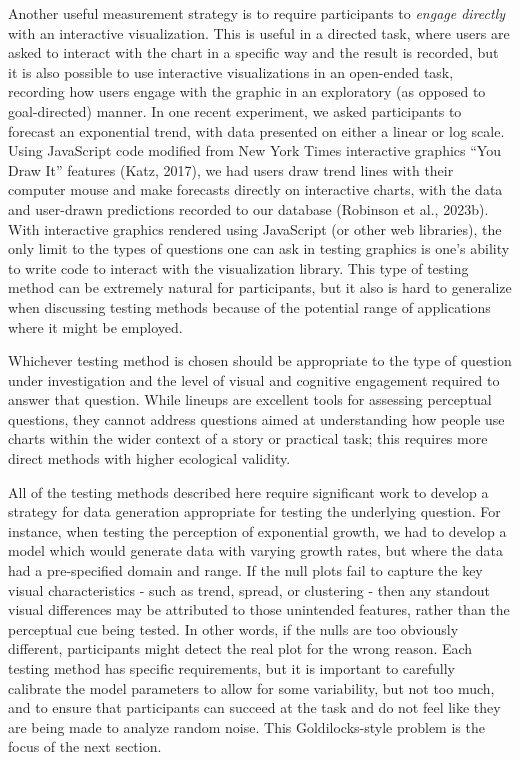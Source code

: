 \documentclass[
  10pt,
]{article}
\begin{document}
Another useful measurement strategy is to require participants to
\emph{engage directly} with an interactive visualization. This is useful
in a directed task, where users are asked to interact with the chart in
a specific way and the result is recorded, but it is also possible to
use interactive visualizations in an open-ended task, recording how
users engage with the graphic in an exploratory (as opposed to
goal-directed) manner. In one recent experiment, we asked participants
to forecast an exponential trend, with data presented on either a linear
or log scale. Using JavaScript code modified from New York Times
interactive graphics ``You Draw It'' features (Katz, 2017), we had users
draw trend lines with their computer mouse and make forecasts directly
on interactive charts, with the data and user-drawn predictions recorded
to our database (Robinson et al., 2023b). With interactive graphics
rendered using JavaScript (or other web libraries), the only limit to
the types of questions one can ask in testing graphics is one's ability
to write code to interact with the visualization library. This type of
testing method can be extremely natural for participants, but it also is
hard to generalize when discussing testing methods because of the
potential range of applications where it might be employed.

Whichever testing method is chosen should be appropriate to the type of
question under investigation and the level of visual and cognitive
engagement required to answer that question. While lineups are excellent
tools for assessing perceptual questions, they cannot address questions
aimed at understanding how people use charts within the wider context of
a story or practical task; this requires more direct methods with higher
ecological validity.

All of the testing methods described here require significant work to
develop a strategy for data generation appropriate for testing the
underlying question. For instance, when testing the perception of
exponential growth, we had to develop a model which would generate data
with varying growth rates, but where the data had a pre-specified domain
and range. If the null plots fail to capture the key visual
characteristics - such as trend, spread, or clustering - then any
standout visual differences may be attributed to those unintended
features, rather than the perceptual cue being tested. In other words,
if the nulls are too obviously different, participants might detect the
real plot for the wrong reason. Each testing method has specific
requirements, but it is important to carefully calibrate the model
parameters to allow for some variability, but not too much, and to
ensure that participants can succeed at the task and do not feel like
they are being made to analyze random noise. This Goldilocks-style
problem is the focus of the next section.
\end{document}
